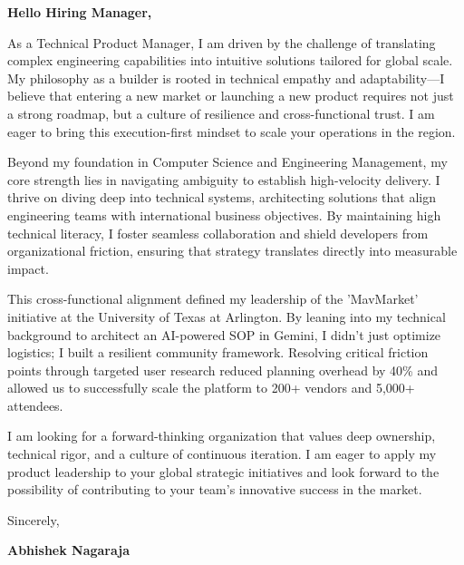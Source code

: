 \documentclass[11pt,letterpaper]{article} %
\begin{document}
\vspace{1.5em}

\textbf{Hello Hiring Manager,}

As a Technical Product Manager, I am driven by the challenge of translating complex engineering capabilities into intuitive solutions tailored for global scale. My philosophy as a builder is rooted in technical empathy and adaptability—I believe that entering a new market or launching a new product requires not just a strong roadmap, but a culture of resilience and cross-functional trust. I am eager to bring this execution-first mindset to scale your operations in the region.

Beyond my foundation in Computer Science and Engineering Management, my core strength lies in navigating ambiguity to establish high-velocity delivery. I thrive on diving deep into technical systems, architecting solutions that align engineering teams with international business objectives. By maintaining high technical literacy, I foster seamless collaboration and shield developers from organizational friction, ensuring that strategy translates directly into measurable impact.

This cross-functional alignment defined my leadership of the 'MavMarket' initiative at the University of Texas at Arlington. By leaning into my technical background to architect an AI-powered SOP in Gemini, I didn't just optimize logistics; I built a resilient community framework. Resolving critical friction points through targeted user research reduced planning overhead by 40\% and allowed us to successfully scale the platform to 200+ vendors and 5,000+ attendees.

I am looking for a forward-thinking organization that values deep ownership, technical rigor, and a culture of continuous iteration. I am eager to apply my product leadership to your global strategic initiatives and look forward to the possibility of contributing to your team's innovative success in the market.

\vspace{1.5em}
Sincerely,

\vspace{1.2em} %
\textbf{Abhishek Nagaraja}
\end{document}
